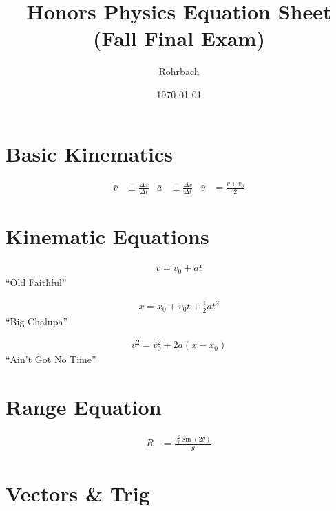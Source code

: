 \documentclass[10pt]{exam}
\title{Honors Physics Equation Sheet (Fall Final Exam)}
\author{Rohrbach}
\date{\today}
\begin{document}
\maketitle

\section*{Basic Kinematics}

\begin{align*}
  \bar{v} &\equiv \frac{\Delta x}{\Delta t} &
  \bar{a} &\equiv \frac{\Delta v}{\Delta t} &
  \bar{v} &= \frac{v+v_0}{2}
\end{align*}


\section*{Kinematic Equations}

\vspace{-3em}

\begin{multicols}{3}
  \begin{center}
  
      \begin{align*}
        v = v_0 + a t
      \end{align*}
      ``Old Faithful''
    
      \begin{align*}
        x = x_0 + v_0t + \frac{1}{2}at^2
      \end{align*}
      ``Big Chalupa''
    
      \begin{align*}
        v^2 = v_0^2 + 2a \left( x - x_0 \right)
      \end{align*}
      ``Ain't Got No Time''
  \end{center}
\end{multicols}


\section*{Range Equation}

\begin{align*}
  R &= \frac{v_0^2 \sin\left(2\theta\right)}{g}
\end{align*}

\section*{Vectors \& Trig}
\end{document}
